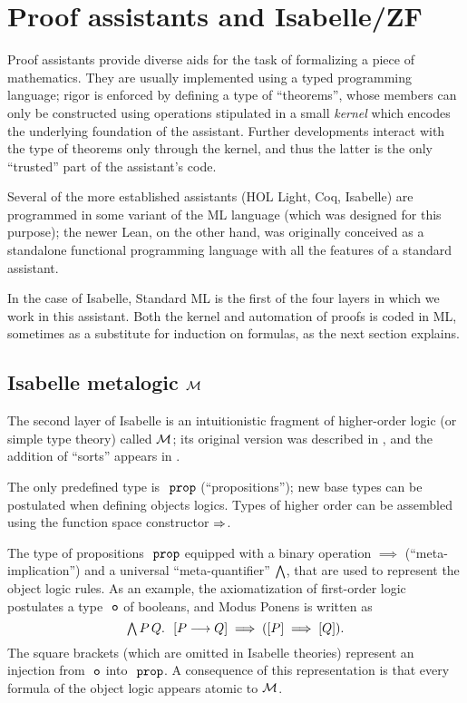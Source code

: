 \section{Proof assistants and Isabelle/ZF}
\label{sec:proof-assist-isabelle}

Proof assistants provide diverse aids for the task
of formalizing a piece of mathematics. They are usually implemented
using a typed programming language; rigor is enforced by defining a
type of ``theorems'', whose members can only be constructed using
operations stipulated in a small \emph{kernel} which encodes the
underlying foundation of the assistant. Further developments interact
with the type of theorems only through the kernel, and thus the latter
is the only ``trusted'' part of the assistant's code.

Several of the more established assistants (HOL Light, Coq, Isabelle)
are programmed in some variant of the ML language (which was
designed for this purpose); the newer Lean, on the other
hand, was originally conceived as a standalone functional programming
language with all the features of a standard assistant.

In the case of Isabelle, Standard ML is the first of the four layers
in which we work in this assistant. Both the kernel and automation
of proofs is coded in ML, sometimes as a substitute for induction on
formulas, as the next section explains.

\subsection{Isabelle metalogic $\mathcal{M}$}
\label{sec:isabelle-metalogic-meta}

The second layer of Isabelle is an
intuitionistic fragment of higher-order logic (or simple type theory)
called $\mathcal{M}$; its original version was described in \cite{Paulson1989},
and the addition of “sorts” appears in \cite{Nipkow-LF-91}.

The only predefined type is $\prop$ (“propositions”); new base types
can be postulated when defining objects logics. Types of higher order can be
assembled using the function space constructor $\Rightarrow$.

The type of propositions $\prop$ equipped with a binary operation
$\implies$ (“meta-implication”) and a universal “meta-quantifier”
$\textstyle\bigwedge$, that are used to represent the object
logic rules. As an example, the axiomatization of first-order logic
postulates a type $\tyo$ of booleans, and Modus Ponens
is written as
\[
  \ALL P\,Q.\ \ [P\limp Q] \implies ([P] \implies [Q]).
\]
The square brackets (which are omitted in Isabelle theories) represent
an injection from $\tyo$ into $\prop$. %
A consequence of this representation is that every formula of
the object logic appears atomic to $\mathcal{M}$.

